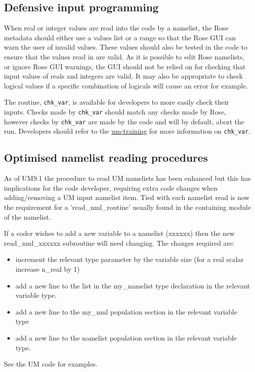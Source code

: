 \subsection{Defensive input programming}
When real or integer values are read into the code by a namelist, 
the Rose metadata should either use a values list or a range so that the Rose GUI can warn the user of invalid values. 
These values should also be tested in the code to ensure that the values read in are valid.
As it is possible to edit Rose namelists, or ignore Rose GUI warnings, 
the GUI should not be relied on for checking that input values of reals and integers are valid. 
It may also be appropriate to check logical values if a specific combination of logicals will
cause an error for example.

The routine, \verb|chk_var|, is available for developers to more easily check their inputs.
Checks made by \verb|chk_var| should match any checks made by Rose, however checks by
\verb|chk_var| are made by the code and will by default, abort the run. Developers
should refer to the \href{https://code.metoffice.gov.uk/doc/um/vn\theumversion/um-training/}
{um-training} for more information on \verb|chk_var|.


\subsection{Optimised namelist reading procedures}
As of UM9.1 the procedure to read UM namelists has been enhanced but this 
has implications for the code developer, requiring extra code changes when adding/removing a UM input namelist item.
Tied with each namelist read is now the requirement for a 'read\_nml\_routine' usually found in the containing module of the namelist.

If a coder wishes to add a new variable to a namelist (xxxxxx) then the new read\_nml\_xxxxxx subroutine will need changing. 
The changes required are:
\begin{itemize}
\item  increment the relevant type parameter by the variable size (for a real scalar increase n\_real by 1)
\item  add a new line to the list in the my\_namelist type declaration in the relevant variable type.
\item  add a new line to the my\_nml population section in the relevant variable type
\item  add a new line to the namelist population section in the relevant variable type. 
\end{itemize}
See the UM code for examples.


